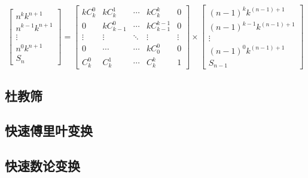 \begin{itemize}
        \begin{equation*}
        \left[
        \begin{matrix}
        {n^{k} k^{n+1}} \\ 
        {n^{k-1} k^{n+1}} \\ 
        \vdots\\
        {n^{0} k^{n+1}} \\ 
        {S_{n}}
        \end{matrix}
        \right]
        =
        \left[
        \begin{matrix}
        {k C_{k}^{0}} & {k C_{k}^{1}} & {\cdots} & {k C_{k}^{k}} & {0} \\ 
        {0} & {k C_{k-1}^{0}} & {\cdots} & {k C_{k-1}^{k-1}} & {0} \\ 
        {\vdots} & {\vdots} & {\ddots} & {\vdots} & {\vdots} \\ 
        {0} & {\cdots} & {\cdots} & {k C_{0}^{0}} & {0} \\ 
        {C_{k}^{0}} & {C_{k}^{1}} & {\cdots} & {C_{k}^{k}} & {1}
        \end{matrix}
        \right]
        \times
        \left[
        \begin{matrix}
        {(n-1)^{k} k^{(n-1)+1}} \\ 
        {(n-1)^{k-1} k^{(n-1)+1}} \\ 
        {\vdots} \\ 
        {(n-1)^{0} k^{(n-1)+1}} \\ 
        {S_{n-1}}
        \end{matrix}
        \right]
        \end{equation*}
\end{itemize}


\subsection{杜教筛}


\subsection{快速傅里叶变换}


\subsection{快速数论变换}
